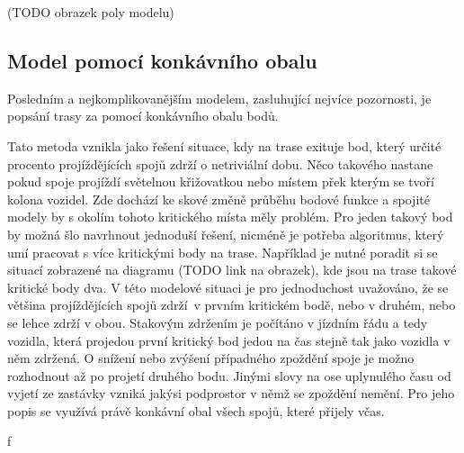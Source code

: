 (TODO obrazek poly modelu)


\subsection{Model pomocí konkávního obalu}

Posledním a nejkomplikovanějším modelem, zasluhující nejvíce pozornosti, je popsání trasy za pomocí konkávního obalu bodů.

\bigbreak

Tato metoda vznikla jako řešení situace, kdy na trase exituje bod, který určité procento projíždějících spojů zdrží o netriviální dobu. Něco takového nastane pokud spoje projíždí světelnou křižovatkou nebo místem přek kterým se tvoří kolona vozidel. Zde dochází ke skové změně průběhu bodové funkce a spojité modely by s okolím tohoto kritického místa měly problém. Pro jeden takový bod by možná šlo navrhnout jednoduší řešení, nicméně je potřeba algoritmus, který umí pracovat s více kritickými body na trase. Například je nutné poradit si se situací zobrazené na diagramu (TODO link na obrazek), kde jsou na trase takové kritické body dva. V této modelové situaci je pro jednoduchost uvažováno, že se většina projíždějících spojů zdrží v prvním kritickém bodě, nebo v druhém, nebo se lehce zdrží v obou. Stakovým zdržením je počítáno v jízdním řádu a tedy vozidla, která projedou první kritický bod jedou na čas stejně tak jako vozidla v něm zdržená. O snížení nebo zvýšení případného zpoždění spoje je možno rozhodnout až po projetí druhého bodu. Jinými slovy na ose uplynulého času od vyjetí ze zastávky vzniká jakýsi podprostor v němž se zpoždění nemění. Pro jeho popis se využívá právě konkávní obal všech spojů, které přijely včas.














































f
